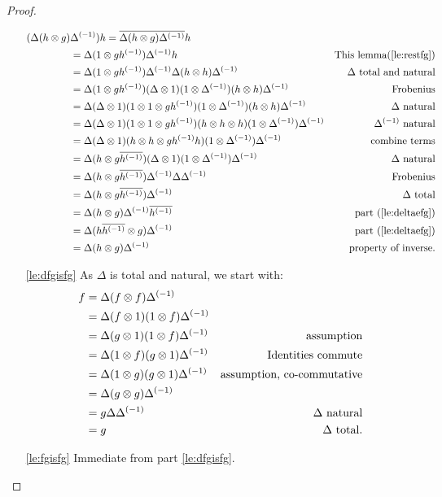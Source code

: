\begin{proof}
\begin{enumerate}[{(}i{)}]
\begin{align*}
        (\Delta (h \otimes g) &{\Delta}^{(-1)})h  = \overline{\Delta (h \otimes g) {\Delta}^{(-1)}}h&\\
        &=\Delta(1 \otimes g {h}^{(-1)}) {\Delta}^{(-1)}h&\text{This lemma(\ref{le:restfg})}\\
        &=\Delta(1 \otimes g {h}^{(-1)}) {\Delta}^{(-1)}\Delta(h\otimes h){\Delta}^{(-1)}&\Delta\text{ total and natural}\\
        &=\Delta(1 \otimes g {h}^{(-1)}) (\Delta \otimes 1)(1\otimes{\Delta}^{(-1)})(h\otimes h){\Delta}^{(-1)}&\text{Frobenius}\\
        &=\Delta(\Delta\otimes1)(1\otimes1\otimes g{h}^{(-1)})(1\otimes{\Delta}^{(-1)}) (h\otimes h){\Delta}^{(-1)}&\Delta \text{ natural}\\
        &=\Delta(\Delta\otimes1)(1\otimes1\otimes g{h}^{(-1)})(h\otimes h\otimes h)(1\otimes{\Delta}^{(-1)}) {\Delta}^{(-1)}&{\Delta}^{(-1)}\text{ natural}\\
        &=\Delta(\Delta\otimes1)(h\otimes h\otimes g{h}^{(-1)}h)(1\otimes{\Delta}^{(-1)}) {\Delta}^{(-1)}&\text{combine terms}\\
        &=\Delta(h\otimes g\overline{{h}^{(-1)}})(\Delta\otimes1)(1\otimes{\Delta}^{(-1)}){\Delta}^{(-1)} &\Delta \text{ natural}\\
        &=\Delta(h\otimes g\overline{{h}^{(-1)}}){\Delta}^{(-1)}\Delta{\Delta}^{(-1)} &\text{Frobenius}\\
        &=\Delta(h \otimes g \overline{{h}^{(-1)}}){\Delta}^{(-1)}&\Delta \text{ total}\\
        &=\Delta(h \otimes g ){\Delta}^{(-1)}\overline{{h}^{(-1)}}& \text{part (\ref{le:deltaefg})}\\
        &=\Delta(h\overline{{h}^{(-1)}}\otimes g){\Delta}^{(-1)}&\text{part (\ref{le:deltaefg})}\\
        &=\Delta(h\otimes g){\Delta}^{(-1)}&\text{property of inverse}.
      \end{align*}

    \item[\vref{le:dfgisfg}]As $\Delta$ is total and natural, we start with:
      \begin{align*}
        f&=\Delta(f\otimes f){\Delta}^{(-1)}  & \\
        &= \Delta(f\otimes1)(1\otimes f){\Delta}^{(-1)} &  \\
        &= \Delta(g\otimes1)(1\otimes f){\Delta}^{(-1)} &\text{assumption} \\
        &= \Delta(1\otimes f)(g\otimes1){\Delta}^{(-1)} &\text{Identities commute}\\
        &= \Delta(1\otimes g)(g\otimes1){\Delta}^{(-1)} &\text{assumption, co-commutative}\\
        &= \Delta(g\otimes g){\Delta}^{(-1)} \\
        &= g\Delta{\Delta}^{(-1)} & \Delta \text{ natural}\\
        &= g&\Delta\text{ total}.
      \end{align*}
    \item[\vref{le:fgisfg}] Immediate from part \vref{le:dfgisfg}.
  \end{enumerate}
\end{proof}

